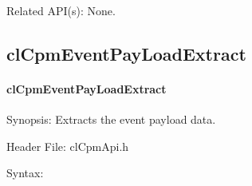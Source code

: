 {\begin{Desc}
\item[Related API(s):]None. \end{Desc}

\newpage






\subsection{clCpmEventPayLoadExtract}
\hypertarget{pagecpm202}{}\paragraph{cl\-Cpm\-Event\-Pay\-Load\-Extract}\label{pagecpm202}
\begin{Desc}
\item[Synopsis:]Extracts the event payload data.\end{Desc}
\begin{Desc}
\item[Header File:]clCpmApi.h\end{Desc}
\begin{Desc}
\item[Syntax:]


\end{Desc}}
